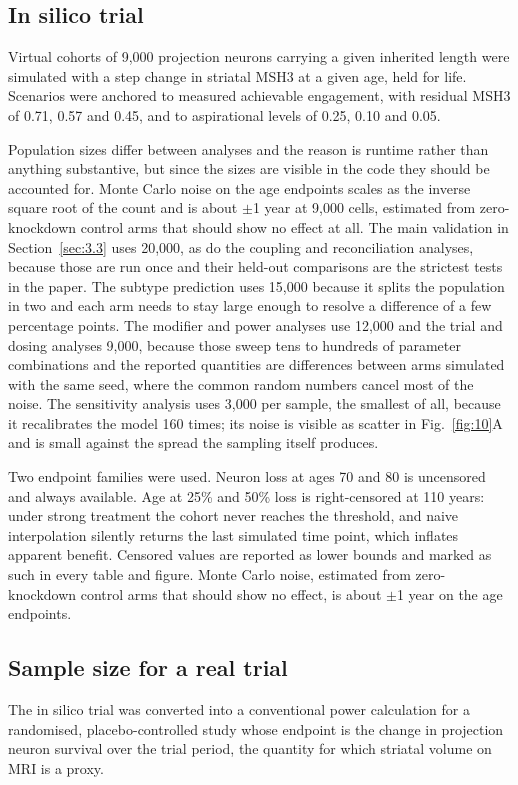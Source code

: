 \documentclass[conference]{IEEEtran}
\begin{document}
\subsection{In silico trial}
\label{sec:2.11}
Virtual cohorts of 9,000 projection neurons carrying a given inherited length were simulated with a step change in striatal MSH3 at a given age, held for life. Scenarios were anchored to measured achievable engagement, with residual MSH3 of 0.71, 0.57 and 0.45, and to aspirational levels of 0.25, 0.10 and 0.05.

Population sizes differ between analyses and the reason is runtime rather than anything substantive, but since the sizes are visible in the code they should be accounted for. Monte Carlo noise on the age endpoints scales as the inverse square root of the count and is about $\pm$1 year at 9,000 cells, estimated from zero-knockdown control arms that should show no effect at all. The main validation in Section~\ref{sec:3.3} uses 20,000, as do the coupling and reconciliation analyses, because those are run once and their held-out comparisons are the strictest tests in the paper. The subtype prediction uses 15,000 because it splits the population in two and each arm needs to stay large enough to resolve a difference of a few percentage points. The modifier and power analyses use 12,000 and the trial and dosing analyses 9,000, because those sweep tens to hundreds of parameter combinations and the reported quantities are differences between arms simulated with the same seed, where the common random numbers cancel most of the noise. The sensitivity analysis uses 3,000 per sample, the smallest of all, because it recalibrates the model 160 times; its noise is visible as scatter in Fig.~\ref{fig:10}A and is small against the spread the sampling itself produces.

Two endpoint families were used. Neuron loss at ages 70 and 80 is uncensored and always available. Age at 25\% and 50\% loss is right-censored at 110 years: under strong treatment the cohort never reaches the threshold, and naive interpolation silently returns the last simulated time point, which inflates apparent benefit. Censored values are reported as lower bounds and marked as such in every table and figure. Monte Carlo noise, estimated from zero-knockdown control arms that should show no effect, is about $\pm$1 year on the age endpoints.

\subsection{Sample size for a real trial}
\label{sec:2.12}
The in silico trial was converted into a conventional power calculation for a randomised, placebo-controlled study whose endpoint is the change in projection neuron survival over the trial period, the quantity for which striatal volume on MRI is a proxy.
\end{document}
